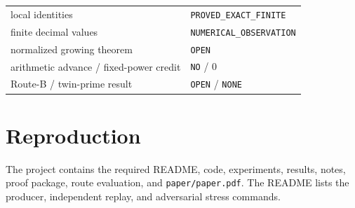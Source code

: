 \documentclass[11pt]{article}
\begin{document}
\begin{center}
\begin{tabular}{@{}ll@{}}
\toprule
local identities & \texttt{PROVED\_EXACT\_FINITE}\\
finite decimal values & \texttt{NUMERICAL\_OBSERVATION}\\
normalized growing theorem & \texttt{OPEN}\\
arithmetic advance / fixed-power credit & \texttt{NO} / 0\\
Route-B / twin-prime result & \texttt{OPEN} / \texttt{NONE}\\
\bottomrule
\end{tabular}
\end{center}

\section*{Reproduction}
The project contains the required README, code, experiments, results, notes,
proof package, route evaluation, and \texttt{paper/paper.pdf}.  The README
lists the producer, independent replay, and adversarial stress commands.
\end{document}
